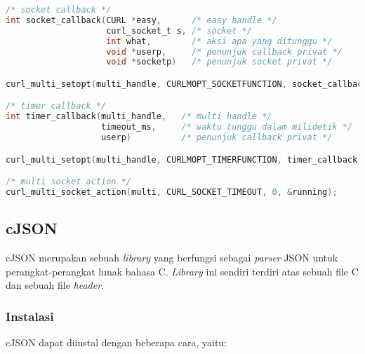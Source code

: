 \begin{lstlisting}[language=C, caption=Kumpulan implementasi pengunaan \textit{multi socket handle} curl, label=code:curl-usage-multisocket]
/* socket callback */
int socket_callback(CURL *easy,      /* easy handle */
                    curl_socket_t s, /* socket */
                    int what,        /* aksi apa yang ditunggu */
                    void *userp,     /* penunjuk callback privat */
                    void *socketp)   /* penunjuk socket privat */

curl_multi_setopt(multi_handle, CURLMOPT_SOCKETFUNCTION, socket_callback);

/* timer callback */
int timer_callback(multi_handle,   /* multi handle */
                   timeout_ms,     /* waktu tunggu dalam milidetik */
                   userp)          /* penunjuk callback privat */

curl_multi_setopt(multi_handle, CURLMOPT_TIMERFUNCTION, timer_callback);

/* multi socket action */
curl_multi_socket_action(multi, CURL_SOCKET_TIMEOUT, 0, &running);
\end{lstlisting}

\subsection{cJSON\footnotemark}
\label{sec:cmodules-cJSON}

cJSON merupakan sebuah \textit{library} yang berfungsi sebagai \textit{parser} JSON untuk perangkat-perangkat lunak bahasa C. \textit{Library} ini sendiri terdiri atas sebuah file C dan sebuah file \textit{header}.

\subsubsection{Instalasi}
\label{sec:cmodules-cJSON-instalation}

cJSON dapat diinstal dengan beberapa cara, yaitu:

